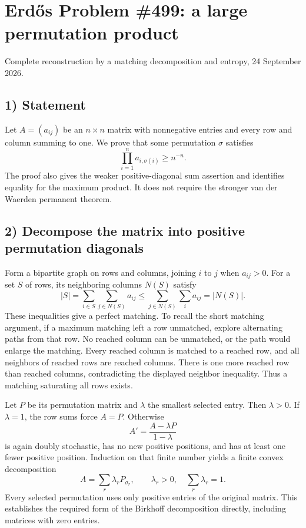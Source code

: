 \section{Erd\H{o}s Problem \#499: a large permutation product}
\noindent Complete reconstruction by a matching decomposition and entropy, 24 September 2026.

\subsection*{1) Statement}
Let $A=(a_{ij})$ be an $n\times n$ matrix with nonnegative entries and every row and column summing to one. We prove that some permutation $\sigma$ satisfies
\[\prod_{i=1}^n a_{i,\sigma(i)}\ge n^{-n}.\tag{1}\]
The proof also gives the weaker positive-diagonal sum assertion and identifies equality for the maximum product. It does not require the stronger van der Waerden permanent theorem.

\subsection*{2) Decompose the matrix into positive permutation diagonals}
Form a bipartite graph on rows and columns, joining $i$ to $j$ when $a_{ij}>0$. For a set $S$ of rows, its neighboring columns $N(S)$ satisfy
\[|S|=\sum_{i\in S}\sum_{j\in N(S)}a_{ij}
\le\sum_{j\in N(S)}\sum_i a_{ij}=|N(S)|.
\]
These inequalities give a perfect matching. To recall the short matching argument, if a maximum matching left a row unmatched, explore alternating paths from that row. No reached column can be unmatched, or the path would enlarge the matching. Every reached column is matched to a reached row, and all neighbors of reached rows are reached columns. There is one more reached row than reached columns, contradicting the displayed neighbor inequality. Thus a matching saturating all rows exists.

Let $P$ be its permutation matrix and $\lambda$ the smallest selected entry. Then $\lambda>0$. If $\lambda=1$, the row sums force $A=P$. Otherwise
\[A'=\frac{A-\lambda P}{1-\lambda}
\]
is again doubly stochastic, has no new positive positions, and has at least one fewer positive position. Induction on that finite number yields a finite convex decomposition
\[A=\sum_r\lambda_r P_{\sigma_r},\qquad
\lambda_r>0,\quad\sum_r\lambda_r=1.\tag{2}\]
Every selected permutation uses only positive entries of the original matrix. This establishes the required form of the Birkhoff decomposition directly, including matrices with zero entries.

